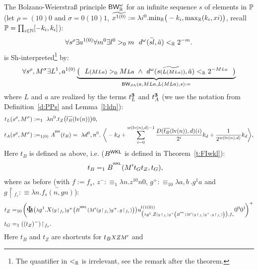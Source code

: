 \begin{thm}\label{c:ND-bw}
The Bolzano-Weierstra{\ss} principle $\textsf{\upshape BW}^\omega_{\mathbb{R}}$ for an infinite 
sequence $s$ of elements in $\mathbb{P}$ (let $\rho=(10)0$ and $\sigma=0(10)1$, 
$\widetilde{x^{1(0)}}:=\lambda i^0.{\min} _{\mathbb{R}}\big(-k_i, 
{\max}_{\mathbb{R}}(k_i, xi)\big)$, recall $\mathbb{P}=\prod_{i\in\mathbb{N}}[-k_i,k_i]$):
\[
  \forall s^{\rho}
         \exists a^{1(0)} \forall m^0\exists l^0>_0 m
           \ \ d^\omega(\widetilde{sl},\tilde a)<_{\mathbb{R}} 2^{-m}
\text{.}
\]
is Sh-interpreted\footnote{The quantifier in $<_{\mathbb{R}}$ is irrelevant, 
see the remark after the theorem.} by:
\[
\forall s^{\rho}, M^{\sigma} \exists L^{1},a^{1(0)}
\underbrace{
  \big(\ \ L\args{(M\args{La})}>_0 M\args{La}\ \wedge\ 
  d^\omega( \widetilde { s\args{(L\args{(M\args{La})})} },\tilde{a})
<_\RR2^{-M\args{La}}\ \ \big) }_{\BW_{Sh}(a,MLa,L(MLa),s) :=}\] 
where $L$ and $a$ are realized by the terms $t_L^\mathbf{3}$ and $t_A^\mathbf{3}$ 
(we use the notation from Definition~\ref{d:PPs} 
and Lemma~\ref{l:ldn}):
\begin{align*} t_L(s^{\rho},M^{\sigma})&:=_1\ 
\lambda n^0.t_Z\big(\overline{t_B}(\l(n))\big)0 \text{,}\\
t_A(s^{\rho},M^{\sigma})&:=_{1(0)} A^{^\BW}(t_B) =\ \lambda d^0,n^0.\ 
\bigg\langle   
-k_d+\sum_{i=0}^{w(\l(n),d)-1}\frac{D(\overline{t_B}
(\l(n)),d)(i)}{2^i}k_d  + \frac{1}{2^{w(\l(n),d)}}k_d\bigg\rangle
\text{,}
\end{align*}
Here $t_B$ is defined as above, i.e. ($B^{\textsf{\upshape WKL}}$ is defined in Theorem~\ref{t:FIwkl}):
\begin{align*}
t_B&=_1 B^{^{\textsf{\upshape WKL}}}(M't_Gt_Z,t_G),
\end{align*}
where as before (with $f:=f_s$, $z^-:\equiv_1\lambda n . z^{10} n 0$, 
$g^+:\equiv_{10}\lambda a,b\ . g^1a$ and 
$g\!\restriction\!{_{f_s}}:\equiv \lambda n. \overleftrightarrow{f_s(n,gn) }$):
\begin{align*}
t_Z&=_{10}\! \bigg(\! \xTWf
    	{\big(    \args \lambda g^1 . X \args {
    														 (g\!\restriction\!{_{f_s}})
    			    									 g^+
    					    							 \big(B^{^\WKL}(M'(g\!\restriction\!{_{f_s}})g^+,g\!\restriction\!{_{f_s}})\big)	}			 \big)}
		  {\big(    \args \lambda g^1 . Z \args {
    														 (g\!\restriction\!{_{f_s}})
    			    									 g^+
    					    							 \big(B^{^\WKL}(M'(g\!\restriction\!{_{f_s}})g^+,g\!\restriction\!{_{f_s}})\big)	}			 \big)}{f_s}
      \!\bigg)^+\\
t_G&=_1 ((t_Z)^-)\!\restriction\!{_{f_s}}\text{.}
\end{align*}
Here $t_B$ and $t_Z$ are shortcuts for $t_B\args{XZM'}$ and 

\end{thm}
